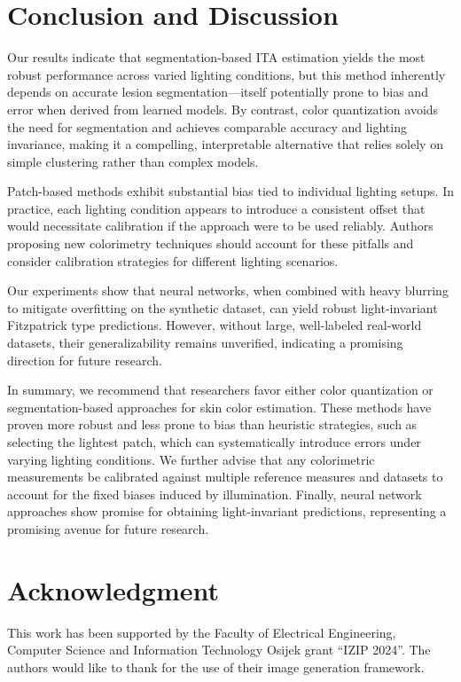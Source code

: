 \documentclass[a4paper,conference]{IEEEtran}
\begin{document}
\section{Conclusion and Discussion}

Our results indicate that segmentation-based ITA estimation yields the most robust performance across varied lighting conditions, 
but this method inherently depends on accurate lesion segmentation---itself potentially prone to bias and error when derived from 
learned models. By contrast, color quantization avoids the need for segmentation and achieves comparable accuracy and lighting 
invariance, making it a compelling, interpretable alternative that relies solely on simple clustering rather than complex models.

Patch-based methods exhibit substantial bias tied to individual lighting setups. In practice, each lighting condition 
appears to introduce a consistent offset that would necessitate calibration if the approach were to be used reliably. Authors proposing new colorimetry 
techniques should account for these pitfalls and consider calibration strategies for different lighting scenarios.

Our experiments show that neural networks, when combined with heavy blurring to mitigate overfitting on the synthetic dataset, can yield robust light-invariant Fitzpatrick type predictions. However, without large, well-labeled real-world datasets, their generalizability remains unverified, indicating a promising direction for future research.

In summary, we recommend that researchers favor either color quantization or segmentation-based approaches for skin color estimation. These methods have proven more robust and less prone to bias than heuristic strategies, such as selecting the lightest patch, which can systematically introduce errors under varying lighting conditions. We further advise that any colorimetric measurements be calibrated against multiple reference measures and datasets to account for the fixed biases induced by illumination. Finally, neural network approaches show promise for obtaining light-invariant predictions, representing a promising avenue for future research.

\section*{Acknowledgment}

This work has been supported by the Faculty of Electrical Engineering, Computer Science and Information Technology Osijek grant ``IZIP 2024''. The authors would like to thank \citet{kim2024ssynth} for the use of their image generation framework.
\end{document}

